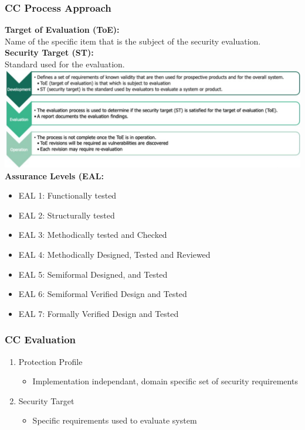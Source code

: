 \subsubsection{CC Process Approach}
\textbf{Target of Evaluation (ToE):}\\
Name of the specific item that is the subject of the security evaluation.\\
\textbf{Security Target (ST):}\\
Standard used for the evaluation.\\
\includegraphics[width=\linewidth]{../img/common_criteria.png}
\textbf{Assurance Levels (EAL:}\\
\begin{itemize}
    \item EAL 1: Functionally tested
    \item EAL 2: Structurally tested
    \item EAL 3: Methodically tested and Checked
    \item EAL 4: Methodically Designed, Tested and Reviewed
    \item EAL 5: Semiformal Designed, and Tested
    \item EAL 6: Semiformal Verified Design and Tested
    \item EAL 7: Formally Verified Design and Tested
\end{itemize}

\columnbreak
\subsubsection{CC Evaluation}
\begin{enumerate}
    \item Protection Profile
    \begin{itemize}
        \item Implementation independant, domain specific set of security requirements
    \end{itemize}
    \item Security Target
    \begin{itemize}
        \item Specific requirements used to evaluate system
    \end{itemize}
\end{enumerate}

